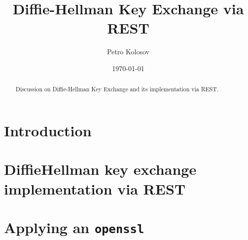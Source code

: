 \documentclass[12pt,letterpaper,oneside,reqno]{amsart}
\title[Diffie-Hellman Key Exchange via REST]
{Diffie-Hellman Key Exchange via REST}
\author[Petro Kolosov]{Petro Kolosov}
\date{\today}
\numberwithin{equation}{section}
\begin{document}
    \begin{abstract}
        Discussion on Diffie-Hellman Key Exchange and its implementation via REST\@.
    \end{abstract}

    \maketitle

    \tableofcontents


    \section{Introduction} \label{sec:introduction}
    


    \section{Diffie\textendash Hellman key exchange implementation via REST}
    \label{sec:diffie–-hellman-key-exchange-implementation-via-rest}
    


    \section{Applying an \texttt{openssl}}\label{sec:applying-an-openssl}
    

    
    
\end{document}
